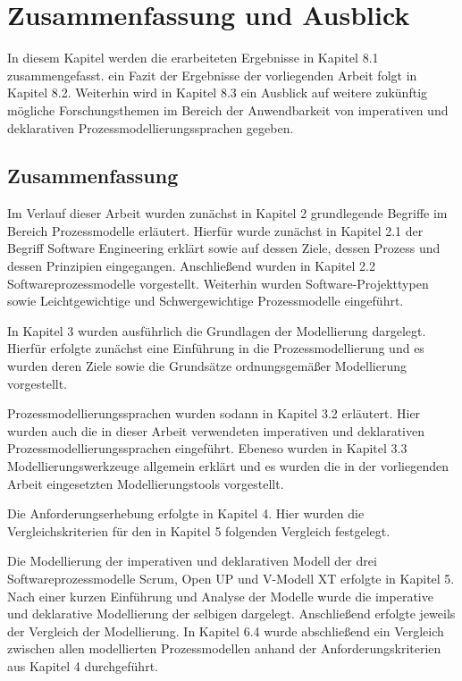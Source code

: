 \chapter{Zusammenfassung und Ausblick}\label{sec:chapter8}
 In diesem Kapitel werden die erarbeiteten Ergebnisse in Kapitel 8.1 zusammengefasst. ein Fazit der Ergebnisse der vorliegenden Arbeit folgt in Kapitel 8.2. Weiterhin wird in Kapitel 8.3 ein Ausblick auf weitere zukünftig mögliche Forschungsthemen im Bereich der Anwendbarkeit von imperativen und deklarativen Prozessmodellierungssprachen gegeben.

\section{Zusammenfassung}

Im Verlauf dieser Arbeit wurden zunächst in Kapitel 2 grundlegende Begriffe im Bereich Prozessmodelle erläutert. Hierfür wurde zunächst in Kapitel 2.1 der Begriff Software Engineering erklärt sowie auf dessen Ziele, dessen Prozess und dessen Prinzipien eingegangen.\newline
Anschließend wurden in Kapitel 2.2 Softwareprozessmodelle vorgestellt. Weiterhin wurden Software-Projekttypen sowie Leichtgewichtige und Schwergewichtige Prozessmodelle eingeführt.\newline

In Kapitel 3 wurden ausführlich die Grundlagen der Modellierung dargelegt. Hierfür erfolgte zunächst eine Einführung in die Prozessmodellierung und es wurden deren Ziele sowie die Grundsätze ordnungsgemäßer Modellierung vorgestellt.\newline

Prozessmodellierungssprachen wurden sodann in Kapitel 3.2 erläutert. Hier wurden auch die in dieser Arbeit verwendeten imperativen und deklarativen Prozessmodellierungssprachen eingeführt.\newline
Ebeneso wurden in Kapitel 3.3 Modellierungswerkzeuge allgemein erklärt und es wurden die in der vorliegenden Arbeit eingesetzten Modellierungstools vorgestellt.\newline

Die Anforderungserhebung erfolgte in Kapitel 4. Hier wurden die Vergleichskriterien für den in Kapitel 5 folgenden Vergleich  festgelegt.\newline

Die Modellierung der imperativen und deklarativen Modell der drei Softwareprozessmodelle Scrum, Open UP und V-Modell XT erfolgte in Kapitel 5. Nach einer kurzen Einführung und Analyse der Modelle wurde die imperative und deklarative Modellierung der selbigen dargelegt. Anschließend erfolgte jeweils der Vergleich der Modellierung. In Kapitel 6.4 wurde abschließend ein Vergleich zwischen allen modellierten Prozessmodellen anhand der Anforderungskriterien aus Kapitel 4 durchgeführt. \newline

